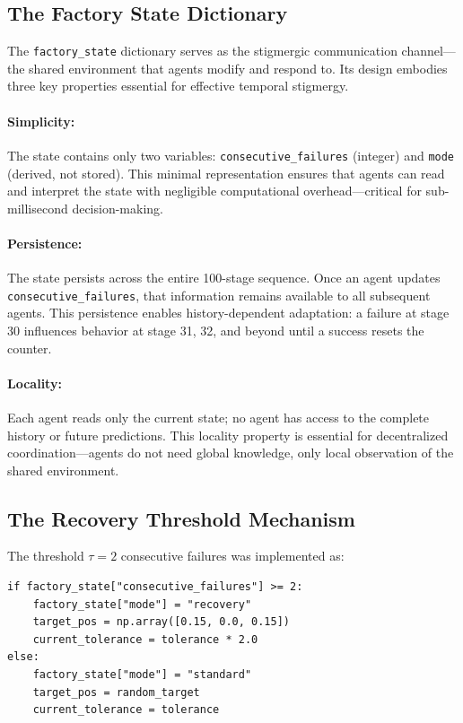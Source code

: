 \documentclass[12pt,a4paper,oneside]{report}
\begin{document}
\subsection{The Factory State Dictionary}

The \texttt{factory\_state} dictionary serves as the stigmergic communication channel---the shared environment that agents modify and respond to. Its design embodies three key properties essential for effective temporal stigmergy.

\paragraph{Simplicity:} The state contains only two variables: \texttt{consecutive\_failures} (integer) and \texttt{mode} (derived, not stored). This minimal representation ensures that agents can read and interpret the state with negligible computational overhead---critical for sub-millisecond decision-making.

\paragraph{Persistence:} The state persists across the entire 100-stage sequence. Once an agent updates \texttt{consecutive\_failures}, that information remains available to all subsequent agents. This persistence enables history-dependent adaptation: a failure at stage 30 influences behavior at stage 31, 32, and beyond until a success resets the counter.

\paragraph{Locality:} Each agent reads only the current state; no agent has access to the complete history or future predictions. This locality property is essential for decentralized coordination---agents do not need global knowledge, only local observation of the shared environment.

\subsection{The Recovery Threshold Mechanism}

The threshold $\tau = 2$ consecutive failures was implemented as:
\begin{verbatim}
if factory_state["consecutive_failures"] >= 2:
    factory_state["mode"] = "recovery"
    target_pos = np.array([0.15, 0.0, 0.15])
    current_tolerance = tolerance * 2.0
else:
    factory_state["mode"] = "standard"
    target_pos = random_target
    current_tolerance = tolerance
\end{verbatim}
\end{document}
